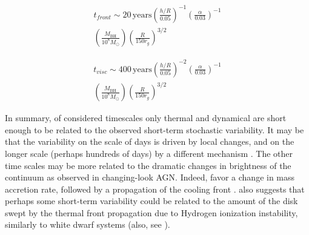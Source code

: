 \documentclass[twocolumn]{aastex62}
\begin{document}
  \begin{eqnarray}
  t_{front} {\sim} 20 \,\mathrm{years} \left( \frac{h/R}{0.05}\right)^{-1}   \left( \frac{\alpha}{0.03}\right)^{-1}  \nonumber  \\ 
  \left( \frac{M_{\mathrm{BH}}}{10^{8} M_{\odot}}\right)     \left( \frac{R}{150 r_{g}}\right) ^{3/2} 
 \end{eqnarray}

  \begin{eqnarray}
  t_{visc}  {\sim} 400 \, \mathrm{years} \left( \frac{h/R}{0.05}\right)^{-2}   \left( \frac{\alpha}{0.03}\right)^{-1} \nonumber  \\  
  \left(\frac{M_{\mathrm{BH}}}{10^{8} M_{\odot}} \right)     \left( \frac{R}{150 r_{g}}\right) ^{3/2}  
 \end{eqnarray}


In summary,  of  considered timescales only thermal and dynamical are short enough to be related to  the observed short-term stochastic variability. It may be that the variability on the scale of days is driven by local changes, and on the longer scale (perhaps hundreds of days) by a different mechanism \citep{kokubo2015}. The other time scales may be more related to the dramatic changes in brightness of the continuum as observed in changing-look AGN. Indeed, \citet{noda2018} favor a change in mass accretion rate, followed by a propagation of the cooling front \cite{lawrence2018, simm2016}. \citet{noda2018} also suggests that perhaps some short-term variability could be related to the amount of the disk swept by the thermal front propagation due to Hydrogen ionization instability, similarly to white dwarf systems (also, see \citealt{ruan2019, ross2018, sniegowska2019}). 
\end{document}
